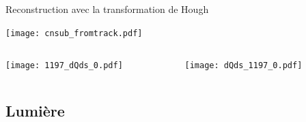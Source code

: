     \begin{frame}{Reconstruction avec la transformation de Hough}
        \begin{scriptsize}
            \begin{center} \texttt{[image: cnsub\_fromtrack.pdf]} \end{center}
            \begin{columns}
                \begin{column}{0.6\textwidth}
                    \texttt{[image: 1197\_dQds\_0.pdf]}
                \end{column}
                \begin{column}{0.4\textwidth}
                    \texttt{[image: dQds\_1197\_0.pdf]}
                \end{column}
            \end{columns}
        \end{scriptsize}
    \end{frame}

  \subsection{Lumière}

